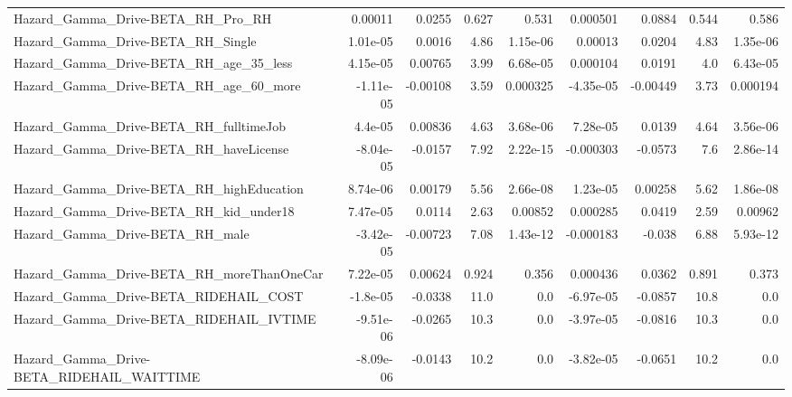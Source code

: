 \begin{tabular}{lrrrrrrrr}
Hazard\_Gamma\_Drive-BETA\_RH\_Pro\_RH                  &     0.00011 &       0.0255 &    0.627 &    0.531 &   0.000501 &      0.0884 &        0.544 &         0.586 \\
Hazard\_Gamma\_Drive-BETA\_RH\_Single                  &    1.01e-05 &       0.0016 &     4.86 & 1.15e-06 &    0.00013 &      0.0204 &         4.83 &      1.35e-06 \\
Hazard\_Gamma\_Drive-BETA\_RH\_age\_35\_less             &    4.15e-05 &      0.00765 &     3.99 & 6.68e-05 &   0.000104 &      0.0191 &          4.0 &      6.43e-05 \\
Hazard\_Gamma\_Drive-BETA\_RH\_age\_60\_more             &   -1.11e-05 &     -0.00108 &     3.59 & 0.000325 &  -4.35e-05 &    -0.00449 &         3.73 &      0.000194 \\
Hazard\_Gamma\_Drive-BETA\_RH\_fulltimeJob             &     4.4e-05 &      0.00836 &     4.63 & 3.68e-06 &   7.28e-05 &      0.0139 &         4.64 &      3.56e-06 \\
Hazard\_Gamma\_Drive-BETA\_RH\_haveLicense             &   -8.04e-05 &      -0.0157 &     7.92 & 2.22e-15 &  -0.000303 &     -0.0573 &          7.6 &      2.86e-14 \\
Hazard\_Gamma\_Drive-BETA\_RH\_highEducation           &    8.74e-06 &      0.00179 &     5.56 & 2.66e-08 &   1.23e-05 &     0.00258 &         5.62 &      1.86e-08 \\
Hazard\_Gamma\_Drive-BETA\_RH\_kid\_under18             &    7.47e-05 &       0.0114 &     2.63 &  0.00852 &   0.000285 &      0.0419 &         2.59 &       0.00962 \\
Hazard\_Gamma\_Drive-BETA\_RH\_male                    &   -3.42e-05 &     -0.00723 &     7.08 & 1.43e-12 &  -0.000183 &      -0.038 &         6.88 &      5.93e-12 \\
Hazard\_Gamma\_Drive-BETA\_RH\_moreThanOneCar          &    7.22e-05 &      0.00624 &    0.924 &    0.356 &   0.000436 &      0.0362 &        0.891 &         0.373 \\
Hazard\_Gamma\_Drive-BETA\_RIDEHAIL\_COST              &    -1.8e-05 &      -0.0338 &     11.0 &      0.0 &  -6.97e-05 &     -0.0857 &         10.8 &           0.0 \\
Hazard\_Gamma\_Drive-BETA\_RIDEHAIL\_IVTIME            &   -9.51e-06 &      -0.0265 &     10.3 &      0.0 &  -3.97e-05 &     -0.0816 &         10.3 &           0.0 \\
Hazard\_Gamma\_Drive-BETA\_RIDEHAIL\_WAITTIME          &   -8.09e-06 &      -0.0143 &     10.2 &      0.0 &  -3.82e-05 &     -0.0651 &         10.2 &           0.0 \\

\end{tabular}

